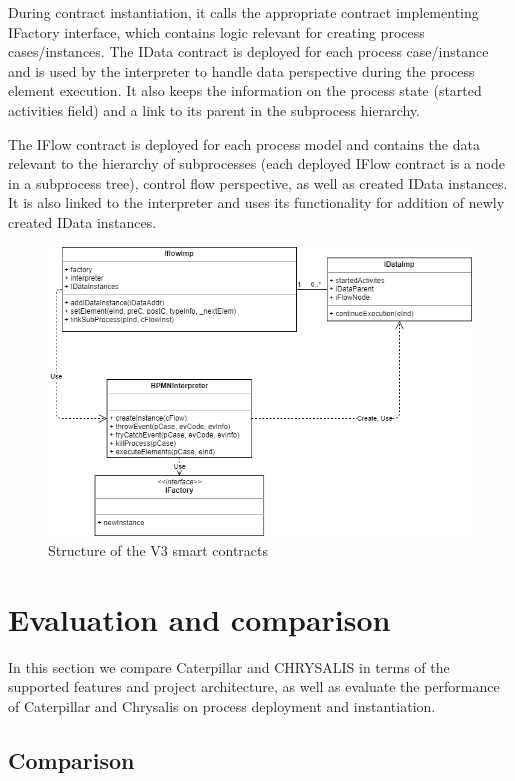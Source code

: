 During contract instantiation, it calls the appropriate contract implementing IFactory interface, which contains logic relevant for creating process cases/instances. The IData contract is deployed for each process case/instance and is used by the interpreter to handle data perspective during the process element execution. It also keeps the information on the process state (started activities field) and a link to its parent in the subprocess hierarchy.

The IFlow contract is deployed for each process model and contains the data relevant to the hierarchy of subprocesses (each deployed IFlow contract is a node in a subprocess tree), control flow perspective, as well as created IData instances. It is also linked to the interpreter and uses its functionality for addition of newly created IData instances.

\begin{figure}[hbt]
	\includegraphics[width=\textwidth]{gfx/caterpillar-interpretation-contracts}
	\caption{Structure of the V3 smart contracts}
	\label{fig:caterpillar:v3:contacts}
\end{figure}

\section{Evaluation and comparison}
\label{sec:caterpillar:eval}

In this section we compare Caterpillar and CHRYSALIS in terms of the supported features and project architecture, as well as evaluate the performance of Caterpillar and Chrysalis on process deployment and instantiation.

\subsection{Comparison}
\label{sec:caterpillar:eval:comp}

